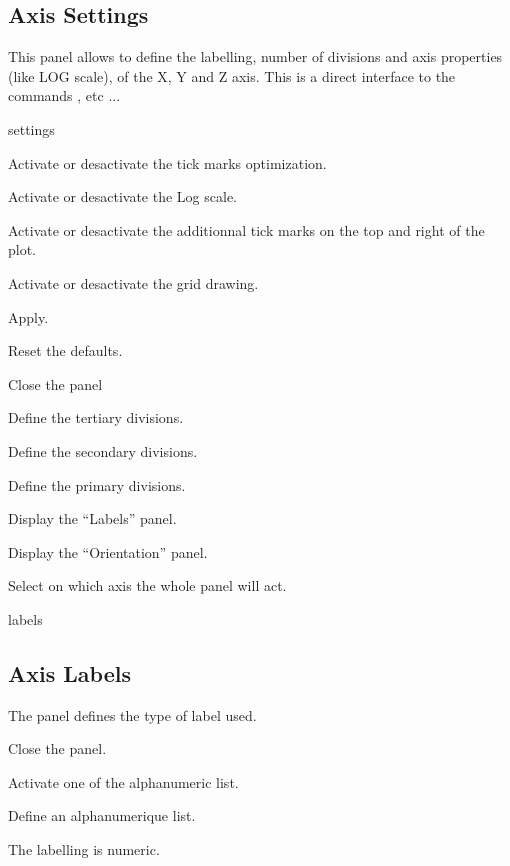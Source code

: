 \newpage

\subsection{Axis Settings}
This panel allows to define the labelling, number of divisions and
axis properties (like LOG scale), of the X, Y and Z axis. This is
a direct interface to the commands ,  etc ... 

\begin{PAWf}[.5]{settings}
\begin{EnumZW}
\item Activate or desactivate the tick marks optimization.
\item Activate or desactivate the Log scale.
\item Activate or desactivate the additionnal tick marks on the top and
      right of the plot.
\item Activate or desactivate the grid drawing.
\end{EnumZW}
\begin{EnumZB}
\item Apply.
\item Reset the defaults.
\item Close the panel
\item Define the tertiary divisions.
\item Define the secondary divisions.
\item Define the primary divisions.
\item Display the ``Labels'' panel.
\item Display the ``Orientation'' panel.
\item Select on which axis the whole panel will act.
\end{EnumZB}
\end{PAWf}

\begin{PAWf}[.5]{labels}
\subsection*{Axis Labels}
The panel defines the type of label used.

\begin{EnumZB}
\item Close the panel.
\item Activate one of the alphanumeric list.
\item Define an alphanumerique list.
\item The labelling is numeric.
\end{EnumZB}
\end{PAWf}

